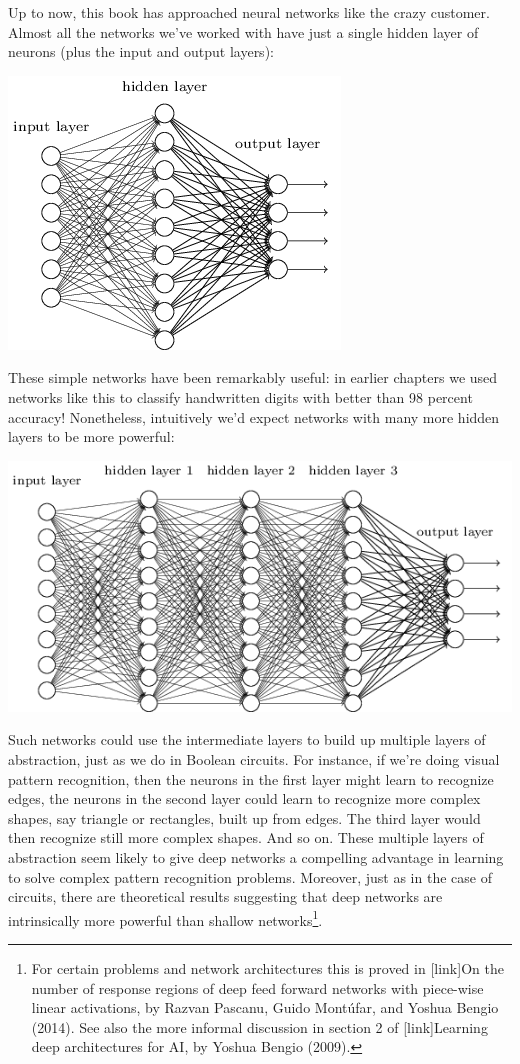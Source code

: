 \documentclass[a4paper,twoside,10pt]{book}
\begin{document}
Up to now, this book has approached neural networks like the crazy customer. Almost all the networks we've worked with have just a single hidden layer of neurons (plus the input and output layers):
\begin{center}
	\includegraphics[width=0.6\linewidth]{figures/ch5/tikz35}
\end{center}
These simple networks have been remarkably useful: in earlier chapters we used networks like this to classify handwritten digits with better than 98 percent accuracy! Nonetheless, intuitively we'd expect networks with many more hidden layers to be more powerful:
\begin{center}
	\includegraphics[width=\linewidth]{figures/ch5/tikz36}
\end{center}
Such networks could use the intermediate layers to build up multiple layers of abstraction, just as we do in Boolean circuits. For instance, if we're doing visual pattern recognition, then the neurons in the first layer might learn to recognize edges, the neurons in the second layer could learn to recognize more complex shapes, say triangle or rectangles, built up from edges. The third layer would then recognize still more complex shapes. And so on. These multiple layers of abstraction seem likely to give deep networks a compelling advantage in learning to solve complex pattern recognition problems. Moreover, just as in the case of circuits, there are theoretical results suggesting that deep networks are intrinsically more powerful than shallow networks\footnote{For certain problems and network architectures this is proved in [link]On the number of response regions of deep feed forward networks with piece-wise linear activations, by Razvan Pascanu, Guido Mont\'ufar, and Yoshua Bengio (2014). See also the more informal discussion in section 2 of [link]Learning deep architectures for AI, by Yoshua Bengio (2009).}.
\end{document}

